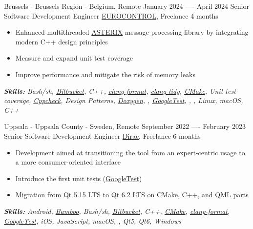 \documentclass[11pt,a4paper,roman]{moderncv}
\begin{document}
\cventry
{Brussels - Brussels Region - Belgium, Remote}
{January 2024 —- April 2024}
{Senior Software Development Engineer}
{\href{https://www.eurocontrol.int}{EUROCONTROL}, Freelance}
{4 months}
{}
{
\begin{itemize}
	\item Enhanced multithreaded \href{https://www.eurocontrol.int/asterix}{ASTERIX} message-processing library by integrating modern C++ design principles
   \item Measure and expand unit test coverage
   \item Improve performance and mitigate the risk of memory leaks
\end{itemize}

{\textcolor{color2}{\textit{\textbf{Skills:}
	Bash/sh,
	\href{https://bitbucket.org}{Bitbucket},
	C++,
	\href{https://clang.llvm.org/docs/ClangFormat.html}{clang-format},
	\href{https://clang.llvm.org/extra/clang-tidy/}{clang-tidy},
	\href{https://cmake.org}{CMake},
	Unit test coverage,
	\href{http://cppcheck.sourceforge.net}{Cppcheck},
	Design Patterns,
	\href{https://www.doxygen.nl}{Doxygen},
	,
	\href{https://github.com/google/googletest}{GoogleTest},
	,
	,
	Linux,
	macOS,
	C++ 
	\newline
}}}}


\cventry
{Uppsala - Uppsala County - Sweden, Remote}
{September 2022 —- February 2023}
{Senior Software Development Engineer}
{\href{https://www.dirac.com}{Dirac}, Freelance}
{6 months}
{}
{
\begin{itemize}
	\item Development aimed at transitioning the tool from an expert-centric usage to a more consumer-oriented interface
	\item Introduce the first unit tests (\href{https://google.github.io/googletest/}{GoogleTest})
	\item Migration from Qt \href{https://doc.qt.io/qt-5/}{5.15 LTS} to \href{https://doc.qt.io/qt-6.2/}{Qt 6.2 LTS} on \href{https://cmake.org}{CMake}, C++, and QML parts
\end{itemize}

{\textcolor{color2}{\textit{\textbf{Skills:}
	Android,
	\href{https://www.atlassian.com/software/bamboo}{Bamboo},
	Bash/sh,
	\href{https://bitbucket.org}{Bitbucket},
	C++,
	\href{https://cmake.org}{CMake},
	\href{https://clang.llvm.org/docs/ClangFormat.html}{clang-format},
	\href{https://github.com/google/googletest}{GoogleTest},
	iOS,
	JavaScript,
	macOS,
	,
   Qt5,
	Qt6,
	Windows
	\newline
}}}}
\end{document}
